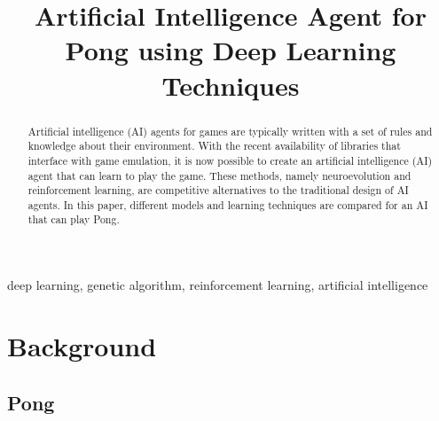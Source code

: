 \documentclass[conference]{IEEEtran}
\begin{document}
\title{Artificial Intelligence Agent for Pong using Deep Learning Techniques}
\author{
\and 
{}
\and 
{}
\and 
{}
}

\maketitle

\begin{abstract}
Artificial intelligence (AI) agents for games are typically written with a set of rules and knowledge about their environment. With the recent availability of libraries that interface with game emulation, it is now possible to create an artificial intelligence (AI) agent that can learn to play the game. These methods, namely neuroevolution and reinforcement learning, are competitive alternatives to the traditional design of AI agents. In this paper, different models and learning techniques are compared for an AI that can play Pong. 
\end{abstract}

\begin{IEEEkeywords}
deep learning, genetic algorithm, reinforcement learning, artificial intelligence
\end{IEEEkeywords}

\section{Background}

\subsection{Pong}
\end{document}
